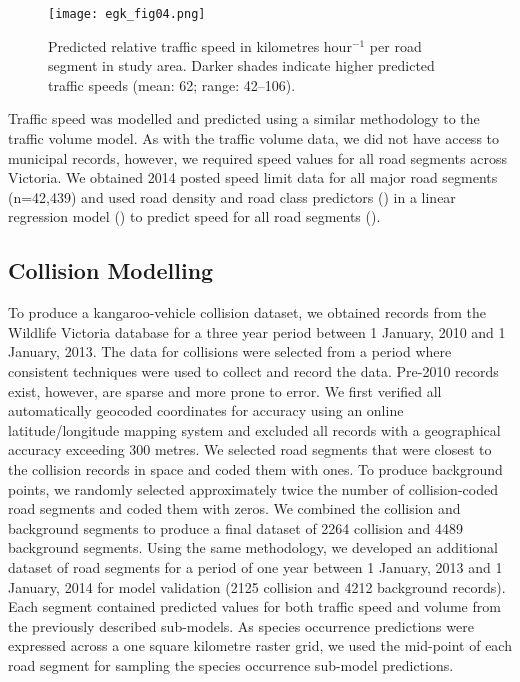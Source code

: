\begin{figure*}[htp]
  \centering
  \texttt{[image: egk\_fig04.png]}
  \caption[Predicted relative traffic speed in Victoria]{Predicted relative traffic speed in kilometres hour$^{-1}$ per road segment in study area. Darker shades indicate higher predicted traffic speeds (mean: 62; range: 42--106).}
  \label{egk_tspdmap}
\end{figure*}

Traffic speed was modelled and predicted using a similar methodology to the traffic volume model. As with the traffic volume data, we did not have access to municipal records, however, we required speed values for all road segments across Victoria. We obtained 2014 posted speed limit data for all major road segments (n=42,439) and used road density and road class predictors () in a linear regression model () to predict speed for all road segments (). 

\subsection{Collision Modelling}

To produce a kangaroo-vehicle collision dataset, we obtained records from the Wildlife Victoria database for a three year period between 1 January, 2010 and 1 January, 2013. The data for collisions were selected from a period where consistent techniques were used to collect and record the data.  Pre-2010 records exist, however, are sparse and more prone to error.  We first verified all automatically geocoded coordinates for accuracy using an online latitude/longitude mapping system \citep{gpsv13} and excluded all records with a geographical accuracy exceeding 300 metres. We selected road segments that were closest to the collision records in space and coded them with ones. To produce background points, we randomly selected approximately twice the number of collision-coded road segments and coded them with zeros. We combined the collision and background segments to produce a final dataset of 2264 collision and 4489 background segments. Using the same methodology, we developed an additional dataset of road segments for a period of one year between 1 January, 2013 and 1 January, 2014 for model validation (2125 collision and 4212 background records). Each segment contained predicted values for both traffic speed and volume from the previously described sub-models. As species occurrence predictions were expressed across a one square kilometre raster grid, we used the mid-point of each road segment for sampling the species occurrence sub-model predictions.

